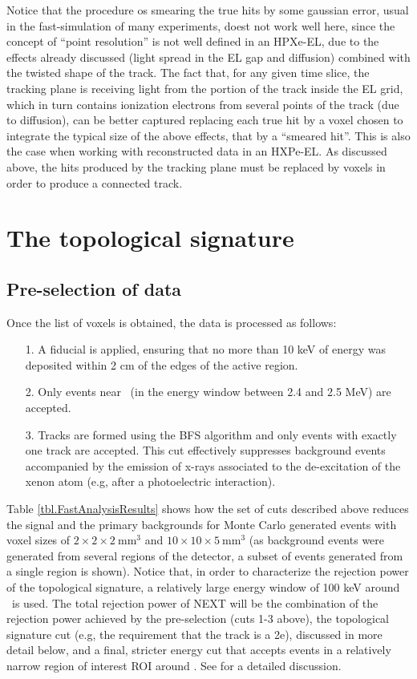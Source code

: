 \documentclass[a4paper,11pt]{article}
\begin{document}
Notice that the procedure os smearing the true hits by some gaussian error, usual in the fast-simulation of many experiments, doest not work well here, since the concept of ``point resolution'' is not well defined in an HPXe-EL, due to the effects already discussed (light spread in the EL gap and diffusion) combined with the twisted shape of the track. The fact that, for any given time slice, the tracking plane is receiving light from the portion of the track inside the EL grid, which in turn contains ionization electrons from several points of the track (due to diffusion), can be better captured replacing each true hit by a voxel chosen to integrate the typical size of the above effects, that by a ``smeared hit''. This is also the case when working with reconstructed data in an HXPe-EL. As discussed above, the hits produced by the tracking plane must be replaced by voxels in order to produce a connected track. 

\section{The topological signature}
\label{sec.top}

\subsection{Pre-selection of data}
\label{ssec.prep}

 Once the list of voxels is obtained, the data is processed as follows: 
\begin{enumerate}
	\item[1.] A fiducial is applied, ensuring that no more than 10 keV of energy was deposited within 2 cm of the edges of the active region.
	\item[2.] Only events near \Qbb\ (in the energy window between 2.4 and 2.5 MeV) are accepted.
	\item[3.] Tracks are formed using the BFS algorithm and only events with exactly one track are accepted.  This cut effectively suppresses background events accompanied by the emission of x-rays associated to the de-excitation of the xenon atom (e.g, after a photoelectric interaction). 
\end{enumerate}

Table \ref{tbl.FastAnalysisResults} shows how the set of cuts described above reduces the signal and the primary backgrounds for Monte Carlo generated events with voxel sizes of $2 \times 2 \times 2 \mathrm{~mm^3}$ and $10 \times 10 \times 5 \mathrm{~mm^3}$ (as background events were generated from several regions of the detector, a subset of events generated from a single region is shown).  Notice that, in order to characterize the rejection power of the topological signature, a relatively large energy window of 100 keV around \Qbb\ is used. The total rejection power of NEXT will be the combination of the rejection power achieved by the pre-selection (cuts 1-3 above), the topological signature cut (e.g, the requirement that the track is a 2e), discussed in more detail below, and a final, stricter energy cut that accepts events in a relatively narrow region of interest ROI around \Qbb. See \cite{Martin-Albo:2015rhw} for a detailed discussion.
\end{document}

